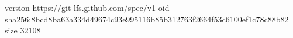 version https://git-lfs.github.com/spec/v1
oid sha256:8bcd8ba63a334d49674c93e995116b85b312763f2664f53c6100ef1c78c88b82
size 32108
